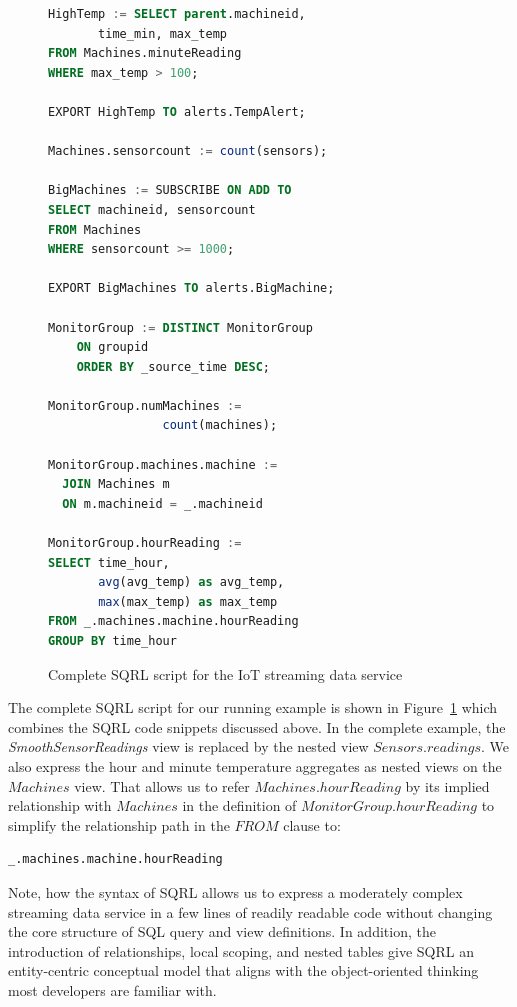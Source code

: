 \documentclass[	DIV=calc,%
							paper=letter,%
							fontsize=11pt,%
							twocolumn]{scrartcl}	 					%
\begin{document}
\begin{figure}[!ht]
\begin{minipage}[r][][b]{1.0\columnwidth}
\begin{lstlisting}[language=SQL]
HighTemp := SELECT parent.machineid,
       time_min, max_temp
FROM Machines.minuteReading
WHERE max_temp > 100;

EXPORT HighTemp TO alerts.TempAlert;

Machines.sensorcount := count(sensors);

BigMachines := SUBSCRIBE ON ADD TO
SELECT machineid, sensorcount
FROM Machines
WHERE sensorcount >= 1000;

EXPORT BigMachines TO alerts.BigMachine;

MonitorGroup := DISTINCT MonitorGroup
    ON groupid
    ORDER BY _source_time DESC;

MonitorGroup.numMachines :=
                count(machines);

MonitorGroup.machines.machine :=
  JOIN Machines m
  ON m.machineid = _.machineid

MonitorGroup.hourReading :=
SELECT time_hour,
       avg(avg_temp) as avg_temp,
       max(max_temp) as max_temp
FROM _.machines.machine.hourReading
GROUP BY time_hour
    \end{lstlisting}
    \end{minipage}
\caption{Complete SQRL script for the IoT streaming data service}
\label{fig:complete_example}
\end{figure}

The complete SQRL script for our running example is shown in Figure~\ref{fig:complete_example} which combines the SQRL code snippets discussed above. In the complete example, the \emph{SmoothSensorReadings} view is replaced by the nested view $Sensors.readings$. We also express the hour and minute temperature aggregates as nested views on the $Machines$ view. That allows us to refer $Machines.hourReading$ by its implied relationship with $Machines$ in the definition of $MonitorGroup.hourReading$ to simplify the relationship path in the $FROM$ clause to:
\begin{lstlisting}[language=SQL]
_.machines.machine.hourReading
\end{lstlisting}

Note, how the syntax of SQRL allows us to express a moderately complex streaming data service in a few lines of readily readable code without changing the core structure of SQL query and view definitions. In addition, the introduction of relationships, local scoping, and nested tables give SQRL an entity-centric conceptual model that aligns with the object-oriented thinking most developers are familiar with.
\end{document}
